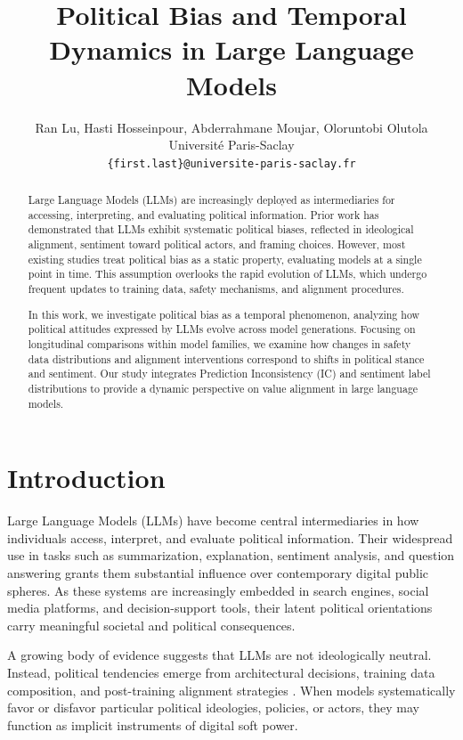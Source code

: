 \documentclass[11pt]{article}
\title{Political Bias and Temporal Dynamics in Large Language Models}
\author{
  Ran Lu, Hasti Hosseinpour, Abderrahmane Moujar, Oloruntobi Olutola \\
  Université Paris-Saclay \\
  \texttt{\{first.last\}@universite-paris-saclay.fr}
}
\begin{document}
\maketitle

\begin{abstract}
Large Language Models (LLMs) are increasingly deployed as intermediaries for accessing, interpreting, and evaluating political information. Prior work has demonstrated that LLMs exhibit systematic political biases, reflected in ideological alignment, sentiment toward political actors, and framing choices. However, most existing studies treat political bias as a static property, evaluating models at a single point in time. This assumption overlooks the rapid evolution of LLMs, which undergo frequent updates to training data, safety mechanisms, and alignment procedures.

In this work, we investigate political bias as a temporal phenomenon, analyzing how political attitudes expressed by LLMs evolve across model generations. Focusing on longitudinal comparisons within model families, we examine how changes in safety data distributions and alignment interventions correspond to shifts in political stance and sentiment. Our study integrates Prediction Inconsistency (IC) and sentiment label distributions to provide a dynamic perspective on value alignment in large language models.
\end{abstract}

\section{Introduction}

Large Language Models (LLMs) have become central intermediaries in how individuals access, interpret, and evaluate political information. Their widespread use in tasks such as summarization, explanation, sentiment analysis, and question answering grants them substantial influence over contemporary digital public spheres. As these systems are increasingly embedded in search engines, social media platforms, and decision-support tools, their latent political orientations carry meaningful societal and political consequences.

A growing body of evidence suggests that LLMs are not ideologically neutral. Instead, political tendencies emerge from architectural decisions, training data composition, and post-training alignment strategies \citep{santurkar2023,buyl2026,hartmann2023,bang2024}. When models systematically favor or disfavor particular political ideologies, policies, or actors, they may function as implicit instruments of digital soft power.
\end{document}
